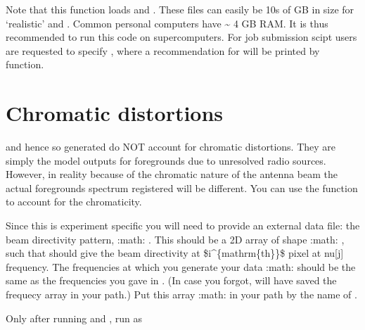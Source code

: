 \documentclass[letterpaper,10pt,english]{sphinxmanual}
\begin{document}
\sphinxAtStartPar
Note that this function loads  and .
These files can easily be 10s of GB in size for ‘realistic’ 
and . Common personal computers have \textasciitilde{} 4 GB RAM. It is thus
recommended to run this code on supercomputers. For job submission scipt
users are requested to specify ,
where a recommendation for  will be printed by
 function.


\section{Chromatic distortions}
\label{\detokenize{detexp:chromatic-distortions}}
\sphinxAtStartPar
{} and hence  so generated do NOT account for
chromatic distortions. They are simply the model outputs for foregrounds
due to unresolved radio sources. However, in reality because of the
chromatic nature of the antenna beam the actual foregrounds spectrum
registered will be different. You can use the function
 to account for the chromaticity.

\sphinxAtStartPar
Since this is experiment specific you will need to provide an external
data file: the beam directivity pattern, :math: . This should be a 2D array
of shape :math: , such that  should
give the beam directivity at \$i\textasciicircum{}\{mathrm\{th\}\}\$ pixel at nu{[}j{]} frequency.
The frequencies at which you generate your data :math:  should be the same
as the frequencies you gave in . (In case you forgot,
 will have saved the frequecy array in your 
path.) Put this array :math:  in your  path by the name of
.

\sphinxAtStartPar
Only after running  and , run 
as
\end{document}

